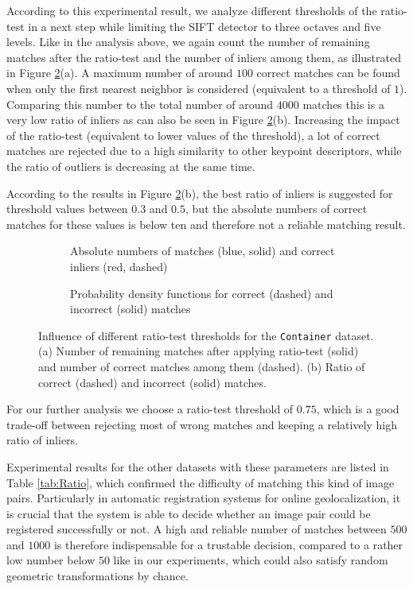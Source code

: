 According to this experimental result, we analyze different thresholds of the ratio-test in a next step while limiting the SIFT detector to three octaves and five levels.
Like in the analysis above, we again count the number of remaining matches after the ratio-test and the number of inliers among them, as illustrated in Figure \ref{fig:Ratio}(a).
A maximum number of around $100$ correct matches can be found when only the first nearest neighbor is considered (equivalent to a threshold of $1$). 
Comparing this number to the total number of around $4000$ matches this is a very low ratio of inliers as can also be seen in Figure \ref{fig:Ratio}(b). 
Increasing the impact of the ratio-test (equivalent to lower values of the threshold), a lot of correct matches are rejected due to a high similarity to other keypoint descriptors, while the ratio of outliers is decreasing at the same time.

According to the results in Figure \ref{fig:Ratio}(b), the best ratio of inliers is suggested for threshold values between $0.3$ and $0.5$, but the absolute numbers of correct matches for these values is below ten and therefore not a reliable matching result.
\begin{figure}[tbp]
       \begin{subfigure}[c]{0.3\linewidth}
	       \centering
			\caption{Absolute numbers of matches (blue, solid) and correct inliers (red, dashed)}
       \end{subfigure}%
       \hspace{3.5cm}
       \begin{subfigure}[c]{0.3\linewidth}  
	       \centering
			\caption{Probability density functions for correct (dashed) and incorrect (solid) matches}
            \label{fig:1}
       \end{subfigure}
       \caption{Influence of different ratio-test thresholds for the \texttt{Container} dataset. (a) Number of remaining matches after applying ratio-test (solid) and number of correct matches among them (dashed). (b) Ratio of correct (dashed) and incorrect (solid) matches.}
       \label{fig:Ratio}
\end{figure}
For our further analysis we choose a ratio-test threshold of $0.75$, which is a good trade-off between rejecting most of wrong matches and keeping a relatively high ratio of inliers.

Experimental results for the other datasets with these parameters are listed in Table \ref{tab:Ratio}, which confirmed the difficulty of matching this kind of image pairs.
Particularly in automatic registration systems for online geolocalization, it is crucial that the system is able to decide whether an image pair could be registered successfully or not.
A high and reliable number of matches between $500$ and $1000$ is therefore indispensable for a trustable decision, compared to a rather low number below $50$ like in our experiments, which could also satisfy random geometric transformations by chance. 


